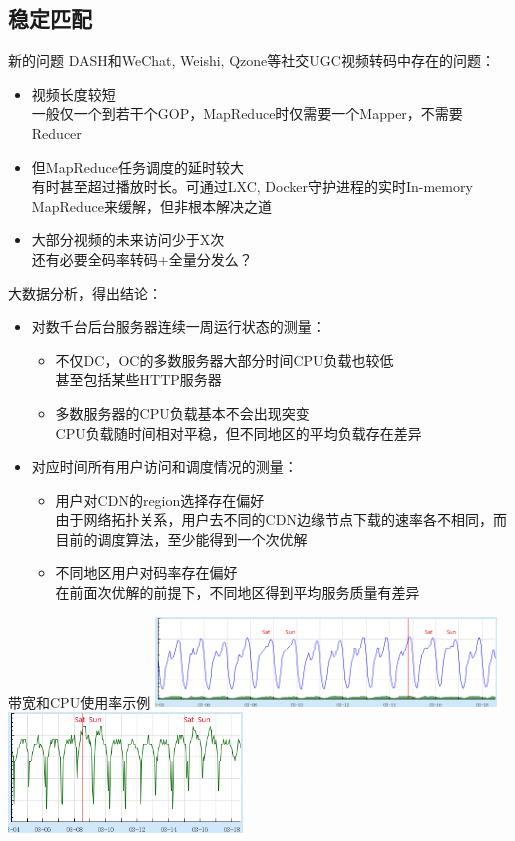 \documentclass{beamer}
\begin{document}
\subsection{稳定匹配}
\begin{frame}{新的问题}
DASH和WeChat, Weishi, Qzone等社交UGC视频转码中存在的问题：\pause
\begin{itemize}
\item 视频长度较短\\
一般仅一个到若干个GOP，MapReduce时仅需要一个Mapper，不需要Reducer
\item 但MapReduce任务调度的延时较大\\
有时甚至超过播放时长。可通过LXC, Docker守护进程的实时In-memory MapReduce来缓解，但非根本解决之道
\item 大部分视频的未来访问少于X次\\
还有必要全码率转码+全量分发么？
\end{itemize}
\end{frame}
\begin{frame}{大数据分析，得出结论：}
\begin{itemize}
	\item 对数千台后台服务器连续一周运行状态的测量：\\
		\begin{itemize}
		\item 不仅DC，OC的多数服务器大部分时间CPU负载也较低\\
		甚至包括某些HTTP服务器
		\item 多数服务器的CPU负载基本不会出现突变\\
		CPU负载随时间相对平稳，但不同地区的平均负载存在差异
		\end{itemize}
	\item 对应时间所有用户访问和调度情况的测量：\\
		\begin{itemize}
		\item 用户对CDN的region选择存在偏好\\
		由于网络拓扑关系，用户去不同的CDN边缘节点下载的速率各不相同，而目前的调度算法，至少能得到一个次优解
		\item 不同地区用户对码率存在偏好\\
		在前面次优解的前提下，不同地区得到平均服务质量有差异
	\end{itemize}
\end{itemize}
\end{frame}
\begin{frame}{带宽和CPU使用率示例}
\includegraphics[height=2.4cm]{fig/bandwidth.png}\\
\includegraphics[height=3.2cm]{fig/cpu_usage.png}
\end{frame}
\end{document}
